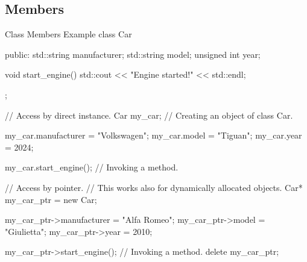 \subsection{Members}

\begin{neonlisting}[language=C++]{Class Members Example}
class Car {
public:
    std::string manufacturer;
    std::string model;
    unsigned int year;

    void start_engine() {
        std::cout << "Engine started!" << std::endl;
    }
};

// Access by direct instance.
Car my_car; // Creating an object of class Car.

my_car.manufacturer = "Volkswagen";
my_car.model = "Tiguan";
my_car.year = 2024;

my_car.start_engine(); // Invoking a method.

// Access by pointer.
// This works also for dynamically allocated objects.
Car* my_car_ptr = new Car{};

my_car_ptr->manufacturer = "Alfa Romeo";
my_car_ptr->model = "Giulietta";
my_car_ptr->year = 2010;

my_car_ptr->start_engine(); // Invoking a method.
delete my_car_ptr;
\end{neonlisting}

